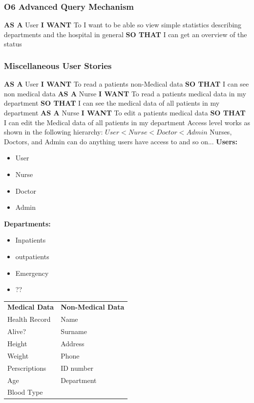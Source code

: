 \subsubsection*{O6 Advanced Query Mechanism}
%
\textbf{AS A} User\hfill \break
\textbf{I WANT} To I want to be able so view simple statistics describing departments and the hospital in general\hfill \break
\textbf{SO THAT} I can get an overview of the status\hfill \medbreak
%
\subsubsection*{Miscellaneous User Stories}
%
\textbf{AS A} User\hfill \break
\textbf{I WANT} To read a patients non-Medical data\hfill \break
\textbf{SO THAT} I can see non medical data\hfill \medbreak
%
\textbf{AS A} Nurse\hfill \break
\textbf{I WANT} To read a patients medical data in my department\hfill \break
\textbf{SO THAT} I can see the medical data of all patients in my department\hfill \medbreak
%
\textbf{AS A} Nurse\hfill \break
\textbf{I WANT} To edit a patients medical data\hfill \break
\textbf{SO THAT} I can edit the Medical data of all patients in my department\hfill \medbreak
%
\newpage
%
Access level works as shown in the following hierarchy:\hfill \break
$User < Nurse < Doctor < Admin$\hfill \bigbreak
%
Nurses, Doctors, and Admin can do anything users have access to and so on...\hfill \bigbreak
%
\textbf{Users:}
\begin{itemize}
    \item User
    \item Nurse
    \item Doctor
    \item Admin
\end{itemize}

\textbf{Departments:}
\begin{itemize}
    \item Inpatients
    \item outpatients
    \item Emergency
    \item ??
\end{itemize}
%
\medbreak
%
\begin{table}[h!]
    \begin{tabular}{ll}
        \textbf{Medical Data} & \textbf{Non-Medical Data} \\
        Health Record         & Name                      \\
        Alive?                & Surname                   \\
        Height                & Address                   \\
        Weight                & Phone                     \\
        Perscriptions         & ID number                 \\
        Age                   & Department                \\
        Blood Type            &
    \end{tabular}
\end{table}
